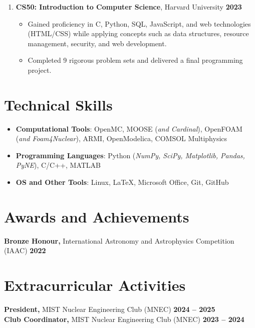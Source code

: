 \documentclass[9pt]{article}
\begin{document}
\begin{enumerate}
    \item \textbf{CS50: Introduction to Computer Science}, Harvard University \hfill \textbf{2023}
    \begin{itemize}\itemsep 0pt \parskip 0pt \parsep 0pt
        \item Gained proficiency in C, Python, SQL, JavaScript, and web technologies (HTML/CSS) while applying concepts such as data structures, resource management, security, and web development.  
        \item Completed 9 rigorous problem sets and delivered a final programming project.  
    \end{itemize}
\end{enumerate}

\section*{Technical Skills}\vspace{-4pt}
\begin{itemize}
    \item \textbf{Computational Tools}: OpenMC, MOOSE (\textit{and Cardinal}), OpenFOAM (\textit{and Foam4Nuclear}), ARMI, OpenModelica, COMSOL Multiphysics
    \item \textbf{Programming Languages}: Python (\textit{NumPy, SciPy, Matplotlib, Pandas, PyNE}), C/C++, MATLAB
    \item \textbf{OS and Other Tools}: Linux, LaTeX, Microsoft Office, Git, GitHub
\end{itemize}

\section*{Awards and Achievements} \vspace{-2pt}
\textbf{Bronze Honour,} International Astronomy and Astrophysics Competition (IAAC) \hfill \textbf{2022}

\section*{Extracurricular Activities} \vspace{-2pt}
\textbf{President,} MIST Nuclear Engineering Club (MNEC) \hfill \textbf{2024 -- 2025} \\
\textbf{Club Coordinator,} MIST Nuclear Engineering Club (MNEC) \hfill \textbf{2023 -- 2024}
\end{document}
